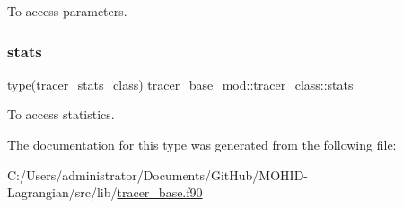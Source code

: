 To access parameters. 

\mbox{\label{structtracer__base__mod_1_1tracer__class_a688d74f9059a50eba8fdd536c2f79876}} 
\subsubsection{\texorpdfstring{stats}{stats}}
{\footnotesize\ttfamily type(\hyperlink{structtracer__base__mod_1_1tracer__stats__class}{tracer\+\_\+stats\+\_\+class}) tracer\+\_\+base\+\_\+mod\+::tracer\+\_\+class\+::stats\hspace{0.3cm}{\ttfamily [private]}}



To access statistics. 



The documentation for this type was generated from the following file\+:\begin{DoxyCompactItemize}
\item 
C\+:/\+Users/administrator/\+Documents/\+Git\+Hub/\+M\+O\+H\+I\+D-\/\+Lagrangian/src/lib/\hyperlink{tracer__base_8f90}{tracer\+\_\+base.\+f90}\end{DoxyCompactItemize}
